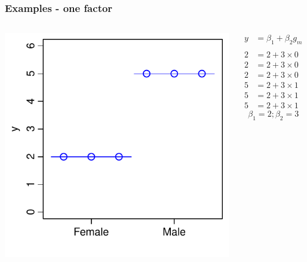 \documentclass[aspectratio=43]{beamer}
\begin{document}
\frame
{\frametitle{Examples - one factor}

\begin{columns}[T]

		\includegraphics[width=\textwidth]{Factor.pdf}
		
		\begin{align*}
		  y  &= \beta_1 + \beta_2 g_m  \\
		  \\
		  2  &= 2 + 3 \times 0 \\
		  2  &= 2 + 3 \times 0 \\
		  2  &= 2 + 3 \times 0 \\
		  5  &= 2 + 3 \times 1 \\  
		  5  &= 2 + 3 \times 1 \\
		  5  &= 2 + 3 \times 1
		\end{align*}
        \[\beta_1 = 2; \beta_2=3\]
\end{columns}
}
\end{document}
